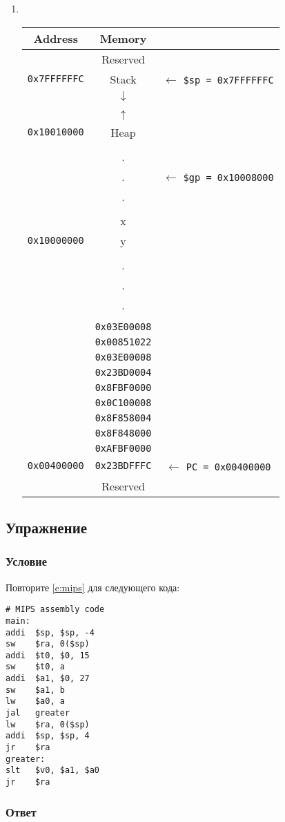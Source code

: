 \documentclass[12pt]{article}
\newenvironment{e}[1][dummy label]{
    \subsection{Упражнение}\label{#1}
    \subsubsection*{Условие}
    }{
    \subsubsection*{Ответ}
}
\newcommand{\eref}[1]{\hyperref[{e:#1}]{\nameref*{e:#1} \ref*{e:#1}}}
\begin{document}
\begin{enumerate}
\newpage

\item ~
\begin{table}[h!]
\small
\setlength\tabcolsep{2pt}
\centering
\begin{tabular}{c|c|c}
Address & Memory & \\
\hline
& Reserved & \\
\hline
\texttt{0x7FFFFFFC} & Stack & $\leftarrow$ \texttt{\$sp = 0x7FFFFFFC} \\
\hline
& $\downarrow$ & \\
&&\\
& $\uparrow$ & \\
\hline
\texttt{0x10010000} & Heap & \\
\hline
&&\\
&.&\\
&.& $\leftarrow$ \texttt{\$gp = 0x10008000}\\
&.&\\
&&\\
& x &\\
\hline
\texttt{0x10000000} & y &\\
\hline
&&\\
&.&\\
&.&\\
&.&\\
&&\\
& \texttt{0x03E00008} &\\
& \texttt{0x00851022} &\\
& \texttt{0x03E00008} &\\
& \texttt{0x23BD0004} &\\
& \texttt{0x8FBF0000} &\\
& \texttt{0x0C100008} &\\
& \texttt{0x8F858004} &\\
& \texttt{0x8F848000} &\\
& \texttt{0xAFBF0000} &\\
\texttt{0x00400000} & \texttt{0x23BDFFFC} & $\leftarrow$ \texttt{PC = 0x00400000}\\
\hline
& Reserved & \\
\end{tabular}
\end{table}
\end{enumerate}

\newpage

\begin{e}
Повторите \eref{mips} для следующего кода:
\begin{verbatim}
# MIPS assembly code
main:
addi  $sp, $sp, -4
sw    $ra, 0($sp)
addi  $t0, $0, 15
sw    $t0, a
addi  $a1, $0, 27
sw    $a1, b
lw    $a0, a
jal   greater
lw    $ra, 0($sp)
addi  $sp, $sp, 4
jr    $ra
greater:
slt   $v0, $a1, $a0
jr    $ra
\end{verbatim}
\end{e}
\end{document}
